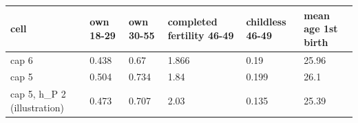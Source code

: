\begingroup\small
\setlength{\tabcolsep}{3pt}
\renewcommand{\arraystretch}{1.04}
\begin{tabularx}{\linewidth}{XXXXXX}
\toprule
cell & own 18-29 & own 30-55 & completed fertility 46-49 & childless 46-49 & mean age 1st birth \\
\midrule
cap 6 & 0.438 & 0.67 & 1.866 & 0.19 & 25.96 \\
cap 5 & 0.504 & 0.734 & 1.84 & 0.199 & 26.1 \\
cap 5, h\_P 2 (illustration) & 0.473 & 0.707 & 2.03 & 0.135 & 25.39 \\
\bottomrule
\end{tabularx}
\endgroup
